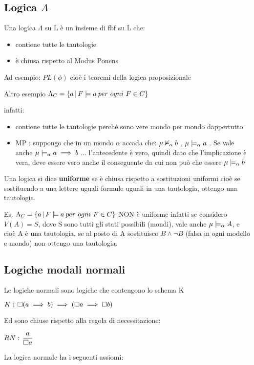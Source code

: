 \subsection{Logica $\Lambda$}

Una logica $\Lambda$ su L è un insieme di fbf su L che: 
\begin{itemize}
\item contiene tutte le tautologie 
\item è chiusa rispetto al Modus Ponens 
\end{itemize}
Ad esempio; $PL(\phi)$ cioè i teoremi della logica proposizionale

Altro esempio $\Lambda_{C}=\{a\,|\,\vera F{a\: per}\ ogni\ F\in C\}$

infatti: 
\begin{itemize}
\item contiene tutte le tautologie perché sono vere mondo per mondo dappertutto 
\item MP : suppongo che in un mondo $\alpha$ accada che: $\mu\nvDash_{\alpha}b$
, $\mu\models_{\alpha}a$ . Se vale anche $\mu\models_{\alpha}a\implies b$
... l'antecedente è vero, quindi dato che l'implicazione è vera, deve
essere vero anche il conseguente da cui non può che essere $\mu\models_{\alpha}b$ 
\end{itemize}
Una logica si dice \textbf{uniforme }se è chiusa rispetto a sostituzioni
uniformi cioè se sostituendo a una lettere uguali formule uguali in
una tautologia, ottengo una tautologia.

Es. $\Lambda_{C}=\{a\,|\,\vera F{a\: per}\ ogni\ F\in C\}$ NON è
uniforme infatti se considero $V(A)=S$, dove S sono tutti gli stati
possibili (mondi), vale anche $\mu\models_{\alpha}A$, e cioè A è
una tautologia, se al posto di A sostituisco $B\wedge\neg B$ (falsa
in ogni modello e mondo) non ottengo una tautologia.


\subsection{Logiche modali normali}

Le logiche normali sono logiche che contengono lo schema K

$K:\,\square(a\implies b)\implies(\square a\implies\square b)$

Ed sono chiuse rispetto alla regola di necessitazione:

$RN:\,\dfrac{a}{\square a}$

La logica normale ha i seguenti assiomi:

